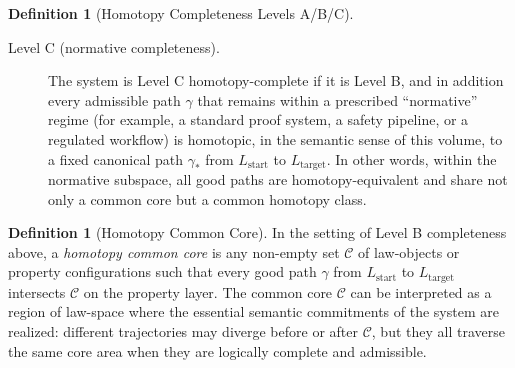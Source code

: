 \documentclass[11pt]{book}
\theoremstyle{plain}
\theoremstyle{definition}
\newtheorem{definition}[theorem]{Definition}
\theoremstyle{remark}
\begin{document}
\begin{definition}[Homotopy Completeness Levels A/B/C]
\begin{description}
  \item[Level C (normative completeness).]
    The system is Level C homotopy-complete if it is Level B, and in
    addition every admissible path $\gamma$ that remains within a prescribed
    ``normative'' regime (for example, a standard proof system, a safety
    pipeline, or a regulated workflow) is homotopic, in the semantic sense
    of this volume, to a fixed canonical path $\gamma_{\ast}$ from
    $L_{\mathrm{start}}$ to $L_{\mathrm{target}}$. In other words, within
    the normative subspace, all good paths are homotopy-equivalent and
    share not only a common core but a common homotopy class.
\end{description}
\end{definition}



\begin{definition}[Homotopy Common Core]
\label{def:homotopy-common-core}
In the setting of Level B completeness above, a \emph{homotopy common
core} is any non-empty set $\mathcal{C}$ of law-objects or property
configurations such that every good path $\gamma$ from
$L_{\mathrm{start}}$ to $L_{\mathrm{target}}$ intersects $\mathcal{C}$ on
the property layer. The common core $\mathcal{C}$ can be interpreted as a
region of law-space where the essential semantic commitments of the system
are realized: different trajectories may diverge before or after
$\mathcal{C}$, but they all traverse the same core area when they are
logically complete and admissible.
\end{definition}
\end{document}
